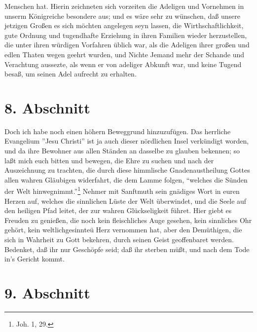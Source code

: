 Menschen hat. Hierin zeichneten sich vorzeiten die Adeligen und Vornehmen in unserm Königreiche besondere aus; und es wäre sehr zu wünschen, daß unsere jetzigen Großen es sich möchten angelegen seyn lassen, die Wirthschaftlichkeit, gute Ordnung und tugendhafte Erziehung in ihren Familien wieder herzustellen, die unter ihren würdigen Vorfahren üblich war, als die Adeligen ihrer großen und edlen Thaten wegen geehrt wurden, und Nichte Jemand mehr der Schande und Verachtung aussezte, als wenn er von adeliger Abkunft war, und keine Tugend besaß, um seinen Adel aufrecht zu erhalten.

\section{8. Abschnitt}

Doch ich habe noch einen höhern Beweggrund hinzuzufügen. Das herrliche Evangelium ''Jesu Christi'' ist ja auch dieser nördlichen Insel verkündigt worden, und da ihre Bewohner aus allen Ständen an dasselbe zu glauben bekennen; so laßt mich euch bitten und bewegen, die Ehre zu suchen und nach der Auszeichnung zu trachten, die durch diese himmlische Gnadenaustheilung Gottes allen wahren Gläubigen widerfahrt, die dem Lamme folgen, "`welches die Sünden der Welt hinwegnimmt."'\footnote{Joh. 1, 29.} Nehmer mit Sanftmuth sein gnädiges Wort in euren Herzen auf, welches die sinnlichen Lüste der Welt überwindet, und die Seele auf den heiligen Pfad leitet, der zur wahren Glückseligkeit führet. Hier giebt es Freuden zu genießen, die noch kein fleischliches Auge gesehen, kein sinnliches Ohr gehört, kein weltlichgesinnteü Herz vernommen hat, aber den Demüthigen, die sich in Wahrheit zu Gott bekehren, durch seinen Geist geoffenbaret werden. Bedenket, daß ihr nur Geschöpfe seid; daß ihr sterben müßt, und nach dem Tode in’s Gericht kommt.

\section{9. Abschnitt}

